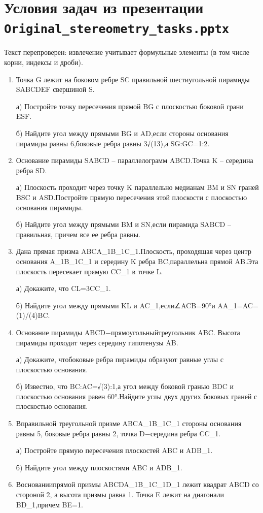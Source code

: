\documentclass[12pt]{article}
\begin{document}
\section*{Условия задач из презентации \texttt{Original\_stereometry\_tasks.pptx}}
Текст перепроверен: извлечение учитывает формульные элементы (в том числе корни, индексы и дроби).
\begin{enumerate}
  \item Точка G лежит на боковом ребре SC правильной шестиугольной пирамиды SABCDEF свершиной S.
  \par а) Постройте точку пересечения прямой BG с плоскостью боковой грани ESF.
  \par б) Найдите угол между прямыми BG и AD,если стороны основания пирамиды равны 6,боковые ребра равны 3√(13),а SG:GC=1:2.
  \item Основание пирамиды SABCD – параллелограмм ABCD.Точка K – середина ребра SD.
  \par а) Плоскость проходит через точку K параллельно медианам BM и SN граней BSC и ASD.Постройте прямую пересечения этой плоскости с плоскостью основания пирамиды.
  \par б) Найдите угол между прямыми BM и SN,если пирамида SABCD – правильная, причем все ее ребра равны.
  \item Дана прямая призма ABCA\_1B\_1C\_1.Плоскость, проходящая через центр основания A\_1B\_1C\_1 и середину K ребра BC,параллельна прямой AB.Эта плоскость пересекает прямую CC\_1 в точке L.
  \par а) Докажите, что CL=3CC\_1.
  \par б) Найдите угол между прямыми KL и AC\_1,если∠ACB=90°и AA\_1=AC=(1)/(4)BC.
  \item Основание пирамиды ABCD−прямоугольныйтреугольник ABC. Высота пирамиды проходит через середину гипотенузы AB.
  \par а) Докажите, чтобоковые ребра пирамиды образуют равные углы с плоскостью основания.
  \par б) Известно, что BC:AC=√(3):1,а угол между боковой гранью BDC и плоскостью основания равен 60°.Найдите углы двух других боковых граней с плоскостью основания.
  \item Вправильной треугольной призме ABCA\_1B\_1C\_1 стороны основания равны 5, боковые ребра равны 2, точка D−середина ребра CC\_1.
  \par а) Постройте прямую пересечения плоскостей ABC и ADB\_1.
  \par б) Найдите угол между плоскостями ABC и ADB\_1.
  \item Воснованиипрямой призмы ABCDA\_1B\_1C\_1D\_1 лежит квадрат ABCD со стороной 2, а высота призмы равна 1. Точка E лежит на диагонали BD\_1,причем BE=1.

\end{enumerate}
\end{document}
